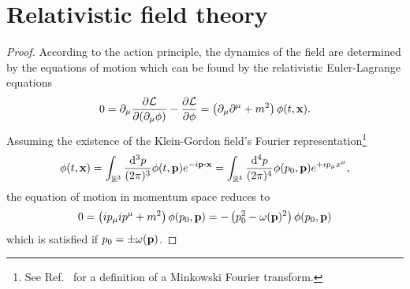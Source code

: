 \section{Relativistic field theory}

\rem
\begin{proof}
	According to the action principle, the dynamics of the field are determined by the equations of motion which can be found by the relativistic Euler-Lagrange equations
	\begin{equation*}
		0
		=
		\partial_\mu\pdv{\mathcal{L}}{(\partial_\mu\phi)}
		-
		\pdv{\mathcal{L}}{\phi}
		=
		\left(
			\partial_\mu\partial^\mu
			+
			m^2
		\right)
		\phi(t,\vb{x})
		.
	\end{equation*}
	Assuming the existence of the Klein-Gordon field's Fourier representation\footnote{See Ref.~\cite[p.~341]{Cohen2019} for a definition of a Minkowski Fourier transform.}
	\begin{equation*}
		\phi(t,\vb{x})
		=
		\int_{\mathbb{R}^3}\frac{\dd[3]{p}}{(2\pi)^3}
		\phi(t,\vb{p})
		e^{-i\vb{p}\vdot\vb{x}}
		=
		\int_{\mathbb{R}^4}\frac{\dd[4]{p}}{(2\pi)^4}
		\phi(p_0,\vb{p})
		e^{+ip_\mu x^\mu}
		,
	\end{equation*}
	the equation of motion in momentum space reduces to
	\begin{equation*}
		0
		=
		\left(
			ip_\mu ip^\mu
			+
			m^2
		\right)
		\phi(p_0,\vb{p})
		=
		-
		\left(
			p_0^2
			-
			\omega(\vb{p})^2
		\right)
		\phi(p_0,\vb{p})
	\end{equation*}
	which is satisfied if $p_0=\pm\omega(\vb{p})$.
\end{proof}

